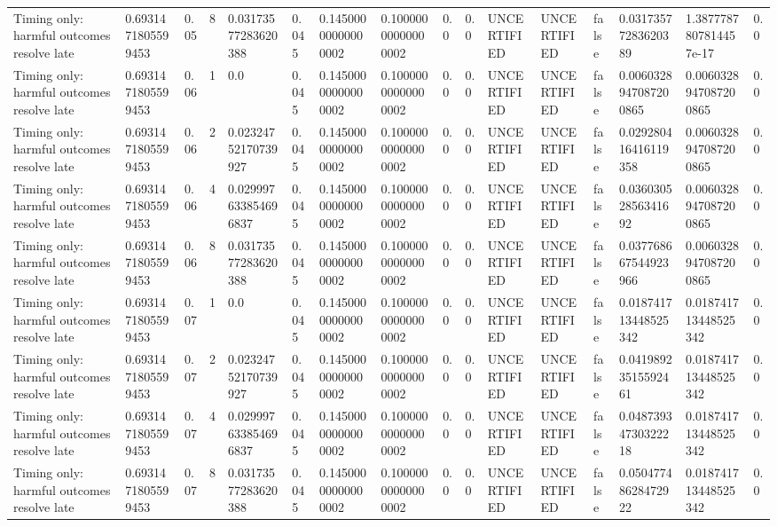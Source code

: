 \begin{tabular}{llllllllllllllll}
Timing only: harmful outcomes resolve late & 0.6931471805599453 & 0.05 & 8 & 0.03173577283620388 & 0.045 & 0.14500000000000002 & 0.10000000000000002 & 0.0 & 0.0 & UNCERTIFIED & UNCERTIFIED & false & 0.03173577283620389 & 1.3877787807814457e-17 & 0.0 \\
Timing only: harmful outcomes resolve late & 0.6931471805599453 & 0.06 & 1 & 0.0 & 0.045 & 0.14500000000000002 & 0.10000000000000002 & 0.0 & 0.0 & UNCERTIFIED & UNCERTIFIED & false & 0.0060328947087200865 & 0.0060328947087200865 & 0.0 \\
Timing only: harmful outcomes resolve late & 0.6931471805599453 & 0.06 & 2 & 0.02324752170739927 & 0.045 & 0.14500000000000002 & 0.10000000000000002 & 0.0 & 0.0 & UNCERTIFIED & UNCERTIFIED & false & 0.029280416416119358 & 0.0060328947087200865 & 0.0 \\
Timing only: harmful outcomes resolve late & 0.6931471805599453 & 0.06 & 4 & 0.029997633854696837 & 0.045 & 0.14500000000000002 & 0.10000000000000002 & 0.0 & 0.0 & UNCERTIFIED & UNCERTIFIED & false & 0.03603052856341692 & 0.0060328947087200865 & 0.0 \\
Timing only: harmful outcomes resolve late & 0.6931471805599453 & 0.06 & 8 & 0.03173577283620388 & 0.045 & 0.14500000000000002 & 0.10000000000000002 & 0.0 & 0.0 & UNCERTIFIED & UNCERTIFIED & false & 0.037768667544923966 & 0.0060328947087200865 & 0.0 \\
Timing only: harmful outcomes resolve late & 0.6931471805599453 & 0.07 & 1 & 0.0 & 0.045 & 0.14500000000000002 & 0.10000000000000002 & 0.0 & 0.0 & UNCERTIFIED & UNCERTIFIED & false & 0.018741713448525342 & 0.018741713448525342 & 0.0 \\
Timing only: harmful outcomes resolve late & 0.6931471805599453 & 0.07 & 2 & 0.02324752170739927 & 0.045 & 0.14500000000000002 & 0.10000000000000002 & 0.0 & 0.0 & UNCERTIFIED & UNCERTIFIED & false & 0.04198923515592461 & 0.018741713448525342 & 0.0 \\
Timing only: harmful outcomes resolve late & 0.6931471805599453 & 0.07 & 4 & 0.029997633854696837 & 0.045 & 0.14500000000000002 & 0.10000000000000002 & 0.0 & 0.0 & UNCERTIFIED & UNCERTIFIED & false & 0.04873934730322218 & 0.018741713448525342 & 0.0 \\
Timing only: harmful outcomes resolve late & 0.6931471805599453 & 0.07 & 8 & 0.03173577283620388 & 0.045 & 0.14500000000000002 & 0.10000000000000002 & 0.0 & 0.0 & UNCERTIFIED & UNCERTIFIED & false & 0.05047748628472922 & 0.018741713448525342 & 0.0 \\

\end{tabular}
